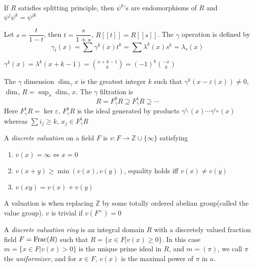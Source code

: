 \documentclass[main]{subfiles}
\begin{document}
\begin{proposition}
If $R$ satisfies splitting principle, then $\psi^k$'s are endomorphisms of $R$ and $\psi^j\psi^k=\psi^{jk}$
\end{proposition}

\begin{definition}
Let $s=\dfrac{t}{1-t}$, then $t=\dfrac{s}{1+s}$, $R[[t]]=R[[s]]$. The $\gamma$ operation is defined by
\[\gamma_t(x)=\sum\gamma^k(x)t^k=\sum\lambda^k(x)s^k=\lambda_s(x)\]
\end{definition}

\begin{example}
$\gamma^k(x)=\lambda^k(x+k-1)=\binom{x+k-1}{k}=(-1)^k\binom{-x}{k}$
\end{example}

\begin{definition}
The $\gamma$ dimension $\dim_{\gamma}x$ is the greatest integer $k$ such that $\gamma^k(x-\varepsilon(x))\neq0$, $\dim_\gamma R=\sup_x\dim_\gamma x$. The $\gamma$ filtration is
\[R=F^0_\gamma R\supseteq F^1_\gamma R\supseteq\cdots\]
Here $F^1_\gamma R=\ker\varepsilon$, $F^k_\gamma R$ is the ideal generated by products $\gamma^{i_1}(x)\cdots\gamma^{i_m}(x)$ whereas $\sum i_j\geq k$, $x_j\in F^1_\gamma R$
\end{definition}

\begin{definition}
A \textit{discrete valuation} on a field $F$ is $v:F\to\mathbb Z\cup\{\infty\}$ satisfying
\begin{enumerate}
\item $v(x)=\infty\iff x=0$
\item $v(x+y)\geq\min(v(x),v(y))$, equality holds iff $v(x)\neq v(y)$
\item $v(xy)=v(x)+v(y)$
\end{enumerate}
A valuation is when replacing $\mathbb Z$ by some totally ordered abelian group(called the value group). $v$ is trivial if $v(F^\times)=0$
\end{definition}

\begin{definition}
A \textit{discrete valuation ring} is an integral domain $R$ with a discretely valued fraction field $F=\operatorname{Frac}(R)$ such that $R=\{x\in F|v(x)\geq0\}$. In this case $m=\{x\in F|v(x)>0\}$ is the unique prime ideal in $R$, and $m=(\pi)$, we call $\pi$ the \textit{uniformizer}, and for $x\in F$, $v(x)$ is the maximal power of $\pi$ in $a$.
\end{definition}
\end{document}
